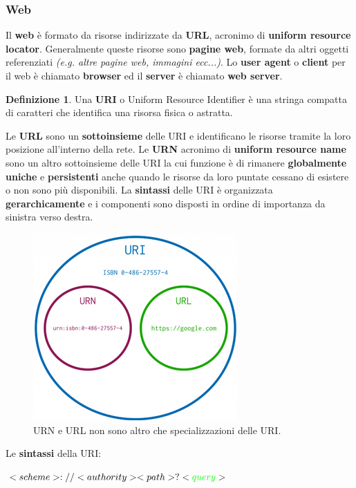 \documentclass[11pt,a4paper]{article}
\theoremstyle{definition}
\newtheorem{definition}{Definizione}[section]
\begin{document}
\subsubsection{Web}
Il \textbf{web} è formato da risorse indirizzate da \textbf{URL}, acronimo di \textbf{uniform resource locator}. Generalmente queste risorse sono \textbf{pagine web}, formate da altri oggetti referenziati \textit{(e.g. altre pagine web, immagini ecc...)}. Lo \textbf{user agent} o \textbf{client} per il web è chiamato \textbf{browser} ed il \textbf{server} è chiamato \textbf{web server}.
\theoremstyle{definition}
\begin{definition}
	Una \textbf{URI} o Uniform Resource Identifier è una stringa compatta di caratteri che identifica una risorsa fisica o astratta.
\end{definition}
Le \textbf{URL} sono un \textbf{sottoinsieme} delle URI e identificano le risorse tramite la loro posizione all'interno della rete. Le \textbf{URN} acronimo di \textbf{uniform resource name} sono un altro sottoinsieme delle URI la cui funzione è di rimanere \textbf{globalmente uniche} e \textbf{persistenti} anche quando le risorse da loro puntate cessano di esistere o non sono più disponibili.
La \textbf{sintassi} delle URI è organizzata \textbf{gerarchicamente} e i componenti sono disposti in ordine di importanza da sinistra verso destra.
\begin{figure}[!h]
	\includegraphics[scale=0.4]{Immagini/URIvsURL.png}
	\centering
	\caption{URN e URL non sono altro che specializzazioni delle URI.}
\end{figure}
\newpage
Le \textbf{sintassi} della URI:\newline\newline
\centerline{\LARGE$<scheme>://<authority><path>?<\textcolor{green}{query}>$}\newline\newline
\end{document}
